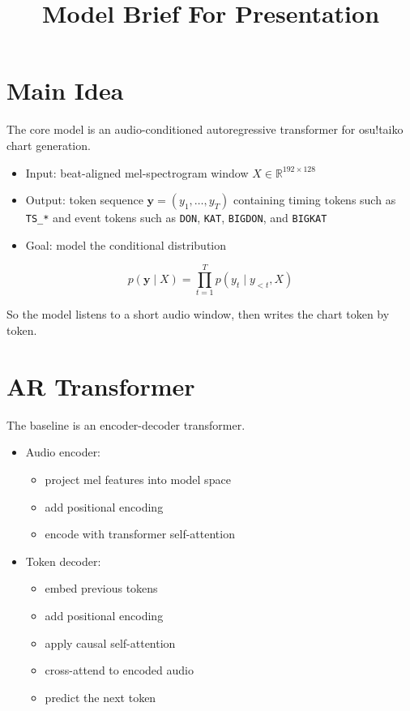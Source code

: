 \documentclass[11pt]{article}
\title{Model Brief For Presentation}
\author{}
\date{}
\begin{document}
\maketitle

\section*{Main Idea}

The core model is an audio-conditioned autoregressive transformer for osu!taiko chart generation.

\begin{itemize}[leftmargin=1.5em]
    \item Input: beat-aligned mel-spectrogram window $X \in \mathbb{R}^{192 \times 128}$
    \item Output: token sequence $\mathbf{y} = (y_1, \dots, y_T)$ containing timing tokens such as \texttt{TS\_*} and event tokens such as \texttt{DON}, \texttt{KAT}, \texttt{BIGDON}, and \texttt{BIGKAT}
    \item Goal: model the conditional distribution
\end{itemize}

\[
p(\mathbf{y} \mid X) = \prod_{t=1}^{T} p(y_t \mid y_{<t}, X)
\]

So the model listens to a short audio window, then writes the chart token by token.

\section*{AR Transformer}

The baseline is an encoder-decoder transformer.

\begin{itemize}[leftmargin=1.5em]
    \item Audio encoder:
    \begin{itemize}[leftmargin=1.5em]
        \item project mel features into model space
        \item add positional encoding
        \item encode with transformer self-attention
    \end{itemize}
    \item Token decoder:
    \begin{itemize}[leftmargin=1.5em]
        \item embed previous tokens
        \item add positional encoding
        \item apply causal self-attention
        \item cross-attend to encoded audio
        \item predict the next token
    \end{itemize}
\end{itemize}
\end{document}
